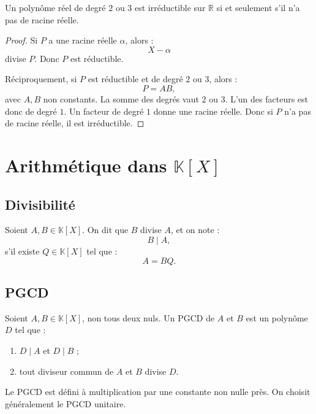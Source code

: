 \documentclass[11pt,a4paper]{article}
\newcommand{\K}{\mathbb K}
\newcommand{\R}{\mathbb R}
\begin{document}
\begin{theorembox}
Un polynôme réel de degré \(2\) ou \(3\) est irréductible sur \(\R\) si et seulement s'il n'a pas de racine réelle.
\end{theorembox}

\begin{proof}
Si \(P\) a une racine réelle \(\alpha\), alors :
\[
X-\alpha
\]
divise \(P\).  
Donc \(P\) est réductible.

Réciproquement, si \(P\) est réductible et de degré \(2\) ou \(3\), alors :
\[
P=AB,
\]
avec \(A,B\) non constants.  
La somme des degrés vaut \(2\) ou \(3\).  
L'un des facteurs est donc de degré \(1\).  
Un facteur de degré \(1\) donne une racine réelle.  
Donc si \(P\) n'a pas de racine réelle, il est irréductible.
\end{proof}

\section{Arithmétique dans \(\K[X]\)}

\subsection{Divisibilité}

\begin{definitionbox}[Divisibilité]
Soient \(A,B\in\K[X]\).  
On dit que \(B\) divise \(A\), et on note :
\[
B\mid A,
\]
s'il existe \(Q\in\K[X]\) tel que :
\[
A=BQ.
\]
\end{definitionbox}

\subsection{PGCD}

\begin{definitionbox}[PGCD]
Soient \(A,B\in\K[X]\), non tous deux nuls.  
Un PGCD de \(A\) et \(B\) est un polynôme \(D\) tel que :
\begin{enumerate}
    \item \(D\mid A\) et \(D\mid B\) ;
    \item tout diviseur commun de \(A\) et \(B\) divise \(D\).
\end{enumerate}
\end{definitionbox}

Le PGCD est défini à multiplication par une constante non nulle près.  
On choisit généralement le PGCD unitaire.
\end{document}
